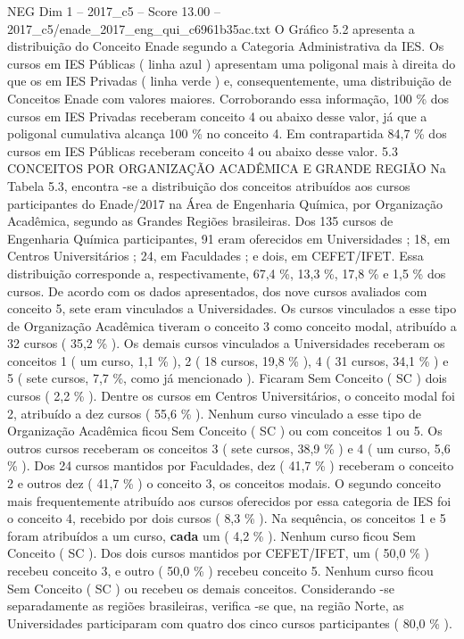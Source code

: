 \begin{textsample}{NEG Dim 1 – 2017\_c5 – Score 13.00 – 2017\_c5/enade\_2017\_eng\_qui\_c6961b35ac.txt}
O Gráfico 5.2 apresenta a distribuição do Conceito Enade segundo a Categoria Administrativa da IES.
Os cursos em IES Públicas ( linha azul ) apresentam uma poligonal mais à direita do que os em IES Privadas ( linha verde ) e, consequentemente, uma distribuição de Conceitos Enade com valores maiores.
Corroborando essa informação, 100 \% dos cursos em IES Privadas receberam conceito 4 ou abaixo desse valor, já que a poligonal cumulativa alcança 100 \% no conceito 4.
Em contrapartida 84,7 \% dos cursos em IES Públicas receberam conceito 4 ou abaixo desse valor. 5.3 CONCEITOS POR ORGANIZAÇÃO ACADÊMICA E GRANDE REGIÃO Na Tabela 5.3, encontra -se a distribuição dos conceitos atribuídos aos cursos participantes do Enade/2017 na Área de Engenharia Química, por Organização Acadêmica, segundo as Grandes Regiões brasileiras.
Dos 135 cursos de Engenharia Química participantes, 91 eram oferecidos em Universidades ; 18, em Centros Universitários ; 24, em Faculdades ; e dois, em CEFET/IFET.
Essa distribuição corresponde a, respectivamente, 67,4 \%, 13,3 \%, 17,8 \% e 1,5 \% dos cursos.
De acordo com os dados apresentados, dos nove cursos avaliados com conceito 5, sete eram vinculados a Universidades.
Os cursos vinculados a esse tipo de Organização Acadêmica tiveram o conceito 3 como conceito modal, atribuído a 32 cursos ( 35,2 \% ).
Os demais cursos vinculados a Universidades receberam os conceitos 1 ( um curso, 1,1 \% ), 2 ( 18 cursos, 19,8 \% ), 4 ( 31 cursos, 34,1 \% ) e 5 ( sete cursos, 7,7 \%, como já mencionado ).
Ficaram Sem Conceito ( SC ) dois cursos ( 2,2 \% ).
Dentre os cursos em Centros Universitários, o conceito modal foi 2, atribuído a dez cursos ( 55,6 \% ).
Nenhum curso vinculado a esse tipo de Organização Acadêmica ficou Sem Conceito ( SC ) ou com conceitos 1 ou 5.
Os outros cursos receberam os conceitos 3 ( sete cursos, 38,9 \% ) e 4 ( um curso, 5,6 \% ).
Dos 24 cursos mantidos por Faculdades, dez ( 41,7 \% ) receberam o conceito 2 e outros dez ( 41,7 \% ) o conceito 3, os conceitos modais.
O segundo conceito mais frequentemente atribuído aos cursos oferecidos por essa categoria de IES foi o conceito 4, recebido por dois cursos ( 8,3 \% ).
Na sequência, os conceitos 1 e 5 foram atribuídos a um curso, \textbf{cada} um ( 4,2 \% ).
Nenhum curso ficou Sem Conceito ( SC ).
Dos dois cursos mantidos por CEFET/IFET, um ( 50,0 \% ) recebeu conceito 3, e outro ( 50,0 \% ) recebeu conceito 5.
Nenhum curso ficou Sem Conceito ( SC ) ou recebeu os demais conceitos.
Considerando -se separadamente as regiões brasileiras, verifica -se que, na região Norte, as Universidades participaram com quatro dos cinco cursos participantes ( 80,0 \% ).

\end{textsample}
